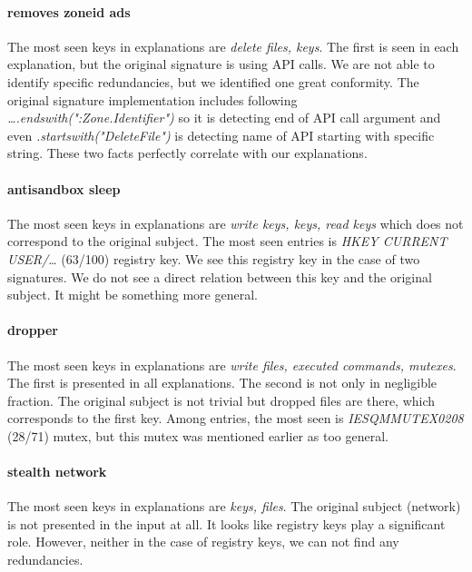 \paragraph{removes zoneid ads}
The most seen keys in explanations are \emph{delete files, keys}. The first is seen in each explanation, but the original signature is using API calls. We are not able to identify specific redundancies, but we identified one great conformity. The original signature implementation includes following \emph{\dots .endswith(":Zone.Identifier")} so it is detecting end of API call argument and even \emph{.startswith("DeleteFile")} is detecting name of API starting with specific string. These two facts perfectly correlate with our explanations.

\paragraph{antisandbox sleep}
The most seen keys in explanations are \emph{write keys, keys, read keys} which does not correspond to the original subject. The most seen entries is \emph{HKEY CURRENT USER/\dots} (63/100) registry key. We see this registry key in the case of two signatures. We do not see a direct relation between this key and the original subject. It might be something more general.

\paragraph{dropper}
The most seen keys in explanations are \emph{write files, executed commands, mutexes}. The first is presented in all explanations. The second is not only in negligible fraction. The original subject is not trivial but dropped files are there, which corresponds to the first key. Among entries, the most seen is \emph{IESQMMUTEX0208} (28/71) mutex, but this mutex was mentioned earlier as too general.

\paragraph{stealth network}
The most seen keys in explanations are \emph{keys, files}. The original subject (network) is not presented in the input at all. It looks like registry keys play a significant role. However, neither in the case of registry keys, we can not find any redundancies.

\hfill \break


